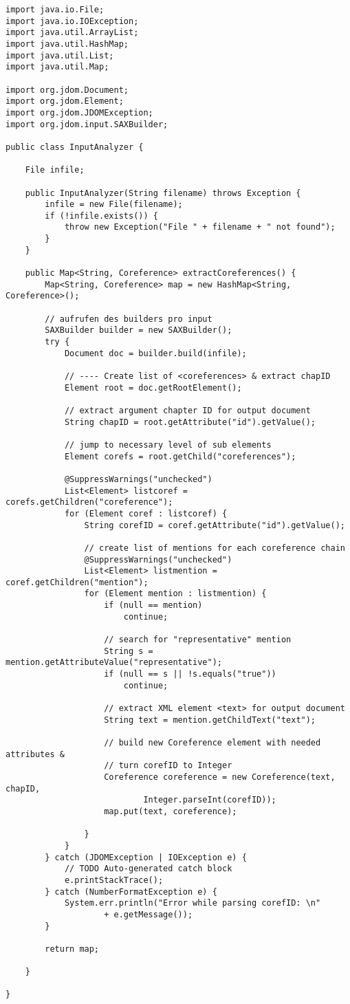 \begin{lstlisting}[caption=InputAnalyzer-Klasse,label=code:InputAnalyzer, name=InputAnalyzer.java]
import java.io.File;
import java.io.IOException;
import java.util.ArrayList;
import java.util.HashMap;
import java.util.List;
import java.util.Map;

import org.jdom.Document;
import org.jdom.Element;
import org.jdom.JDOMException;
import org.jdom.input.SAXBuilder;

public class InputAnalyzer {

	File infile;
	
	public InputAnalyzer(String filename) throws Exception {
		infile = new File(filename);
		if (!infile.exists()) {
			throw new Exception("File " + filename + " not found");
		}
	}

	public Map<String, Coreference> extractCoreferences() {
		Map<String, Coreference> map = new HashMap<String, Coreference>();

		// aufrufen des builders pro input
		SAXBuilder builder = new SAXBuilder();
		try {
			Document doc = builder.build(infile);

			// ---- Create list of <coreferences> & extract chapID
			Element root = doc.getRootElement();

			// extract argument chapter ID for output document
			String chapID = root.getAttribute("id").getValue();

			// jump to necessary level of sub elements
			Element corefs = root.getChild("coreferences");

			@SuppressWarnings("unchecked")
			List<Element> listcoref = corefs.getChildren("coreference");
			for (Element coref : listcoref) {
				String corefID = coref.getAttribute("id").getValue();

				// create list of mentions for each coreference chain
				@SuppressWarnings("unchecked")
				List<Element> listmention = coref.getChildren("mention");
				for (Element mention : listmention) {
					if (null == mention)
						continue;
					
					// search for "representative" mention
					String s = mention.getAttributeValue("representative");
					if (null == s || !s.equals("true"))
						continue;

					// extract XML element <text> for output document
					String text = mention.getChildText("text");

					// build new Coreference element with needed attributes &
					// turn corefID to Integer
					Coreference coreference = new Coreference(text, chapID,
							Integer.parseInt(corefID));
					map.put(text, coreference);

				}
			}
		} catch (JDOMException | IOException e) {
			// TODO Auto-generated catch block
			e.printStackTrace();
		} catch (NumberFormatException e) {
			System.err.println("Error while parsing corefID: \n"
					+ e.getMessage());
		}

		return map;

	}

}
\end{lstlisting}
